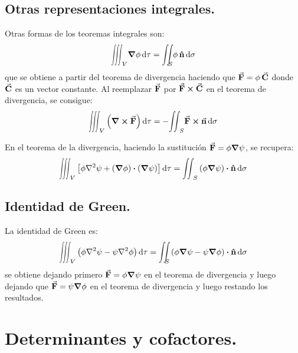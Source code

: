 \documentclass[hidelinks,12pt]{article}
\def\scaleiint#1{\vcenter{\hbox{\scaleto[3ex]{\displaystyle\iint}{#1}}}}
\def\scaleiiint#1{\vcenter{\hbox{\scaleto[3ex]{\displaystyle\iiint}{#1}}}}
\def\bs{\mkern-12mu}
\begin{document}
\subsection{Otras representaciones integrales.}

Otras formas de los teoremas integrales son:
\begin{align*}
\scaleiiint{6ex}_{V} \gradient{\phi} \dd{\tau} = \scaleiint{6ex}_{\bs S} \phi \, \vu{n} \dd{\sigma}
\end{align*}
que se obtiene a partir del teorema de divergencia haciendo que $\va{F} = \phi \, \va{C}$ donde $\va{C}$ es un vector constante. Al reemplazar $\va{F}$ por $\va{F} \cross \va{C}$ en el teorema de divergencia, se consigue:
\begin{align*}
\scaleiiint{6ex}_{V} \left( \curl{\va{F}} \right) \dd{\tau} = - \scaleiint{6ex}_{S} \va{F} \cross \va{n} \dd{\sigma}
\end{align*}

En el teorema de la divergencia, haciendo la sustitución $\va{F} = \phi \grad{\psi}$, se recupera:
\begin{align*}
\scaleiiint{6ex}_{V} \left[ \phi \laplacian{\psi} + \left( \gradient{\phi} \right) \vdot \left( \gradient{\psi} \right) \right] \dd{\tau} = \scaleiint{6ex}_{S} \left( \phi \gradient{\psi} \right) \vdot \vu{n} \dd{\sigma}
\end{align*}

\subsection{Identidad de Green.}

La identidad de Green es:
\begin{align*}
\scaleiiint{6ex}_{V} \left( \phi \laplacian{\psi} - \psi \laplacian{\phi} \right) \dd{\tau} = \scaleiint{6ex}_{\bs S} \left( \phi \gradient{\psi} - \psi \gradient{\phi} \right) \vdot \vu{n} \dd{\sigma}
\end{align*}
se obtiene dejando primero $\va{F} = \phi \gradient{\psi}$ en el teorema de divergencia y luego dejando que $\va{F} = \psi \gradient{\phi}$ en el teorema de divergencia y luego restando los resultados.

\section{Determinantes y cofactores.}
\end{document}
